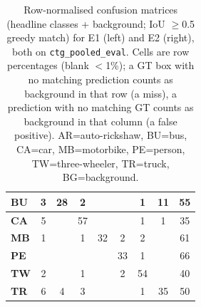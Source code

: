 \begin{table}[t]
\begin{minipage}{0.48\linewidth}
\begin{tabular}{|l|c|c|c|c|c|c|c|c|}
\hline
\textbf{BU} & \cellcolor{blue!3}3 & \cellcolor{blue!28}28 & \cellcolor{blue!2}2 &  &  & \cellcolor{blue!1}1 & \cellcolor{blue!11}11 & \cellcolor{blue!55}55 \\
\hline
\textbf{CA} & \cellcolor{blue!5}5 &  & \cellcolor{blue!57}57 &  &  & \cellcolor{blue!1}1 & \cellcolor{blue!1}1 & \cellcolor{blue!35}35 \\
\hline
\textbf{MB} & \cellcolor{blue!1}1 &  & \cellcolor{blue!1}1 & \cellcolor{blue!32}32 & \cellcolor{blue!2}2 & \cellcolor{blue!2}2 &  & \cellcolor{blue!61}61 \\
\hline
\textbf{PE} &  &  &  &  & \cellcolor{blue!33}33 & \cellcolor{blue!1}1 &  & \cellcolor{blue!66}66 \\
\hline
\textbf{TW} & \cellcolor{blue!2}2 &  & \cellcolor{blue!1}1 &  & \cellcolor{blue!2}2 & \cellcolor{blue!54}54 &  & \cellcolor{blue!40}40 \\
\hline
\textbf{TR} & \cellcolor{blue!6}6 & \cellcolor{blue!4}4 & \cellcolor{blue!3}3 &  &  & \cellcolor{blue!1}1 & \cellcolor{blue!35}35 & \cellcolor{blue!50}50 \\
\hline
\end{tabular}
\end{minipage}
\caption{Row-normalised confusion matrices (headline classes + background; IoU $\geq$0.5 greedy match) for E1 (left) and E2 (right), both on \texttt{ctg\_pooled\_eval}. Cells are row percentages (blank $<$1\%); a GT box with no matching prediction counts as background in that row (a miss), a prediction with no matching GT counts as background in that column (a false positive). AR=auto-rickshaw, BU=bus, CA=car, MB=motorbike, PE=person, TW=three-wheeler, TR=truck, BG=background.}
\label{tab:confusion}
\end{table}
